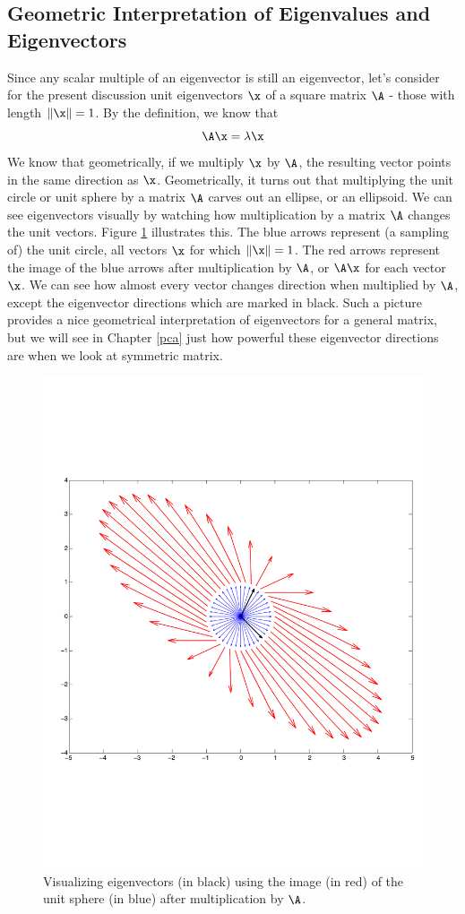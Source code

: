 \documentclass[
]{article}
\theoremstyle{definition}
\theoremstyle{definition}
\theoremstyle{definition}
\theoremstyle{definition}
\theoremstyle{remark}
\begin{document}
\hypertarget{geometric-interpretation-of-eigenvalues-and-eigenvectors}{%
\subsection{Geometric Interpretation of Eigenvalues and Eigenvectors}\label{geometric-interpretation-of-eigenvalues-and-eigenvectors}}

Since any scalar multiple of an eigenvector is still an eigenvector, let's consider for the present discussion unit eigenvectors \(\x\) of a square matrix \(\A\) - those with length \(\|\x\|=1\). By the definition, we know that
\[\A\x = \lambda\x\]
We know that geometrically, if we multiply \(\x\) by \(\A\), the resulting vector points in the same direction as \(\x\). Geometrically, it turns out that multiplying the unit circle or unit sphere by a matrix \(\A\) carves out an ellipse, or an ellipsoid. We can see eigenvectors visually by watching how multiplication by a matrix \(\A\) changes the unit vectors. Figure \ref{fig:eigenarrows} illustrates this. The blue arrows represent (a sampling of) the unit circle, all vectors \(\x\) for which \(\|\x\|=1\). The red arrows represent the image of the blue arrows after multiplication by \(\A\), or \(\A\x\) for each vector \(\x\). We can see how almost every vector changes direction when multiplied by \(\A\), except the eigenvector directions which are marked in black. Such a picture provides a nice geometrical interpretation of eigenvectors for a general matrix, but we will see in Chapter \ref{pca} just how powerful these eigenvector directions are when we look at symmetric matrix.



\begin{figure}

{\centering \includegraphics[width=0.5\linewidth]{figs/eigenarrows} 

}

\caption{Visualizing eigenvectors (in black) using the image (in red) of the unit sphere (in blue) after multiplication by \(\A\).}\label{fig:eigenarrows}
\end{figure}
\end{document}
